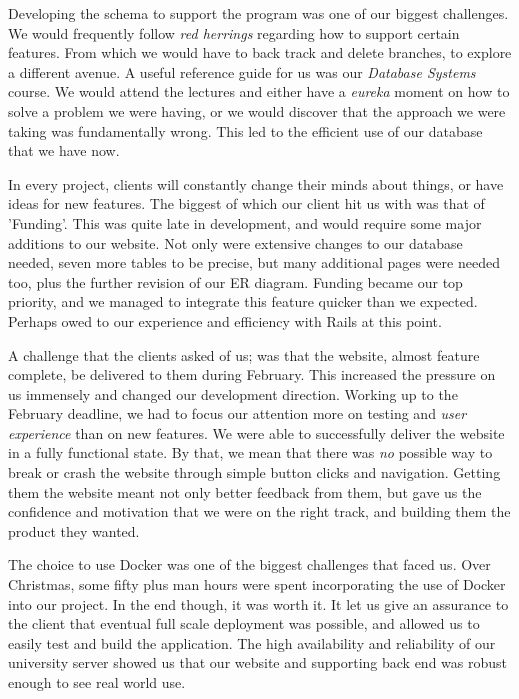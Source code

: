 \documentclass{l3proj}
\begin{document}
Developing the schema to support the program was one of our biggest challenges. We would frequently follow \textit{red herrings} regarding how to support certain features. From which we would have to back track and delete branches, to explore a different avenue. A useful reference guide for us was our \textit{Database Systems} course. We would attend the lectures and either have a \textit{eureka} moment on how to solve a problem we were having, or we would discover that the approach we were taking was fundamentally wrong. This led to the efficient use of our database that we have now.

In every project, clients will constantly change their minds about things, or have ideas for new features. The biggest of which our client hit us with was that of 'Funding'. This was quite late in development, and would require some major additions to our website. Not only were extensive changes to our database needed, seven more tables to be precise, but many additional pages were needed too, plus the further revision of our ER diagram. Funding became our top priority, and we managed to integrate this feature quicker than we expected. Perhaps owed to our experience and efficiency with Rails at this point.

A challenge that the clients asked of us; was that the website, almost feature complete, be delivered to them during February. This increased the pressure on us immensely and changed our development direction. Working up to the February deadline, we had to focus our attention more on testing and \textit{user experience} than on new features. We were able to successfully deliver the website in a fully functional state. By that, we mean that there was \textit{no} possible way to break or crash the website through simple button clicks and navigation. Getting them the website meant not only better feedback from them, but gave us the confidence and motivation that we were on the right track, and building them the product they wanted.

The choice to use Docker was one of the biggest challenges that faced us. Over Christmas, some fifty plus man hours were spent incorporating the use of Docker into our project. In the end though, it was worth it. It let us give an assurance to the client that eventual full scale deployment was possible, and allowed us to easily test and build the application. The high availability and reliability of our university server showed us that our website and supporting back end was robust enough to see real world use.
\end{document}
